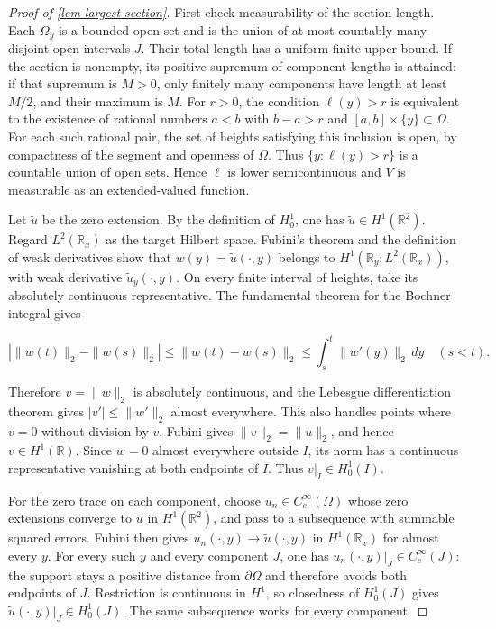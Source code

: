\documentclass[11pt,a4paper]{article}
\theoremstyle{proofmanuscript}
\begin{document}
\begin{proof}[Proof of \ref{lem-largest-section}]

First check measurability of the section length. Each \(\Omega_y\) is a bounded open set and is the union of at most countably many disjoint open intervals \(J\). Their total length has a uniform finite upper bound. If the section is nonempty, its positive supremum of component lengths is attained: if that supremum is \(M>0\), only finitely many components have length at least \(M/2\), and their maximum is \(M\). For \(r>0\), the condition \(\ell(y)>r\) is equivalent to the existence of rational numbers \(a<b\) with \(b-a>r\) and \([a,b]\times\{y\}\subset\Omega\). For each such rational pair, the set of heights satisfying this inclusion is open, by compactness of the segment and openness of \(\Omega\). Thus \(\{y:\ell(y)>r\}\) is a countable union of open sets. Hence \(\ell\) is lower semicontinuous and \(V\) is measurable as an extended-valued function.

Let \(\widetilde u\) be the zero extension. By the definition of \(H_0^1\), one has \(\widetilde u\in H^1(\mathbb R^2)\). Regard \(L^2(\mathbb R_x)\) as the target Hilbert space. Fubini's theorem and the definition of weak derivatives show that \(w(y)=\widetilde u(\cdot,y)\) belongs to \(H^1(\mathbb R_y;L^2(\mathbb R_x))\), with weak derivative \(\widetilde u_y(\cdot,y)\). On every finite interval of heights, take its absolutely continuous representative. The fundamental theorem for the Bochner integral gives

\[
|\|w(t)\|_2-\|w(s)\|_2|\le\|w(t)-w(s)\|_2
\le\int_s^t\|w'(y)\|_2\,dy\quad(s<t).
\]

Therefore \(v=\|w\|_2\) is absolutely continuous, and the Lebesgue differentiation theorem gives \(|v'|\le\|w'\|_2\) almost everywhere. This also handles points where \(v=0\) without division by \(v\). Fubini gives \(\|v\|_2=\|u\|_2\), and hence \(v\in H^1(\mathbb R)\). Since \(w=0\) almost everywhere outside \(I\), its norm has a continuous representative vanishing at both endpoints of \(I\). Thus \(v|_I\in H_0^1(I)\).

For the zero trace on each component, choose \(u_n\in C_c^\infty(\Omega)\) whose zero extensions converge to \(\widetilde u\) in \(H^1(\mathbb R^2)\), and pass to a subsequence with summable squared errors. Fubini then gives \(u_n(\cdot,y)\to\widetilde u(\cdot,y)\) in \(H^1(\mathbb R_x)\) for almost every \(y\). For every such \(y\) and every component \(J\), one has \(u_n(\cdot,y)|_J\in C_c^\infty(J)\): the support stays a positive distance from \(\partial\Omega\) and therefore avoids both endpoints of \(J\). Restriction is continuous in \(H^1\), so closedness of \(H_0^1(J)\) gives \(\widetilde u(\cdot,y)|_J\in H_0^1(J)\). The same subsequence works for every component.


\end{proof}
\end{document}
